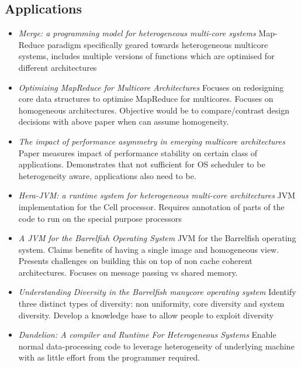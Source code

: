 \subsection{Applications}
\begin{itemize}
\item \emph{Merge: a programming model for heterogeneous multi-core systems}
Map-Reduce paradigm specifically geared towards heterogeneous multicore systems,
includes multiple versions of functions which are optimised for different architectures \cite{LCWM:08}
\item \emph{Optimizing MapReduce for Multicore Architectures} Focuses on redesigning
core data structures to optimise MapReduce for multicores. Focuses on homogeneous
architectures. Objective would be to compare/contrast design decisions with
above paper when can assume homogeneity. \cite{Mao10optimizingmapreduce}
\item \emph{The impact of performance asymmetry in emerging multicore architectures}
Paper measures impact of performance stability on certain class of applications.
Demonstrates that not sufficient for OS scheduler to be heterogeneity aware,
applications also need to be. \cite{Balakrishnan:2005:IPA:1069807.1070012} 
\item \emph{Hera-JVM: a runtime system for heterogeneous multi-core 
architectures} JVM implementation for the Cell processor. Requires annotation
of parts of the code to run on the special purpose processors \cite{McIlroy:2010:HRS:1869459.1869478}
\item \emph{A JVM for the Barrelfish Operating System} JVM for the Barrelfish
operating system. Claims benefits of having a single image and homogeneous view. 
Presents challenges on building this on top of non cache coherent architectures.
Focuses on message passing vs shared memory. \cite{maasjvm} 
\item \emph{Understanding Diversity in the Barrelfish manycore operating system}
Identify three distinct types of diversity: non uniformity, core diversity and 
system diversity. Develop a knowledge base to allow people to exploit
diversity \cite{Schüpbach08embracingdiversity}
\item \emph{Dandelion: A compiler and Runtime For Heterogeneous Systems} 
Enable normal data-processing code to leverage heterogeneity of underlying
machine with as little effort from the programmer required. \cite{Rossbach:2013:DCR:2517349.2522715}
\end{itemize}

